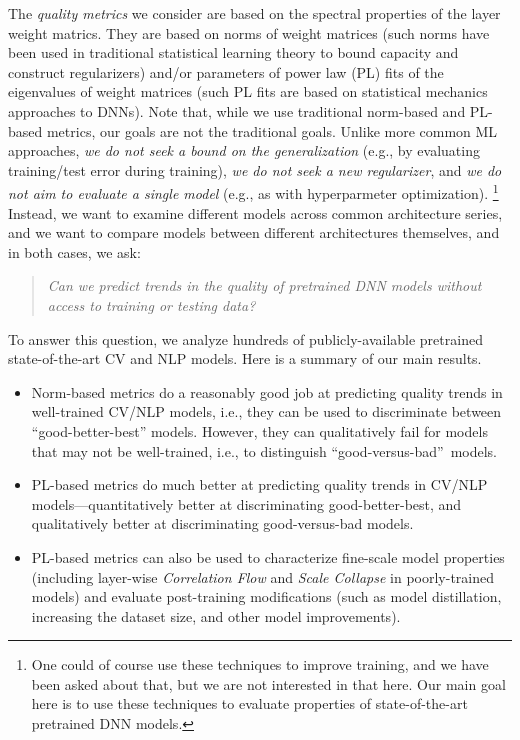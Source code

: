 The \emph{quality metrics} we consider are based on the spectral properties of the layer weight matrics.
They are based on norms of weight matrices (such norms have been used in traditional statistical learning theory to bound capacity and construct regularizers) and/or parameters of power law (PL) fits of the eigenvalues of weight matrices (such PL fits are based on statistical mechanics approaches to DNNs).
Note that, while we use traditional norm-based and PL-based metrics, our goals are not the traditional goals.
Unlike more common ML approaches, \emph{we do not seek a bound on the generalization} (e.g., by evaluating training/test error during training), \emph{we do not seek a new regularizer}, and \emph{we do not aim to evaluate a single model} (e.g., as with hyperparmeter optimization).%
\footnote{One could of course use these techniques to improve training, and we have been asked about that, but we are not interested in that here. Our main goal here is to use these techniques to evaluate properties of state-of-the-art pretrained DNN models.}
Instead, we want to examine different models across common architecture series, and we want to compare models between different architectures themselves, and in both cases, we ask:
\begin{quote}
\emph{Can we predict trends in the quality of pretrained DNN models without access to training or testing data?}  
\end{quote}



To answer this question, we analyze hundreds of publicly-available pretrained state-of-the-art CV and NLP models. 
Here is a summary of our main results.
\begin{itemize}
\item
Norm-based metrics do a reasonably good job at predicting quality trends in well-trained CV/NLP models, i.e., they can be used to discriminate between ``good-better-best'' models.
However, they can qualitatively fail for models that may not be well-trained, i.e., to distinguish ``good-versus-bad''~models.
\item 
PL-based metrics do much better at predicting quality trends in CV/NLP models---quantitatively better at discriminating good-better-best, and qualitatively better at discriminating good-versus-bad models.
\item 
PL-based metrics can also be used to characterize fine-scale model properties (including layer-wise \emph{Correlation Flow} and \emph{Scale Collapse} in poorly-trained models) and evaluate post-training modifications (such as model distillation, increasing the dataset size, and other model improvements).
\end{itemize}

